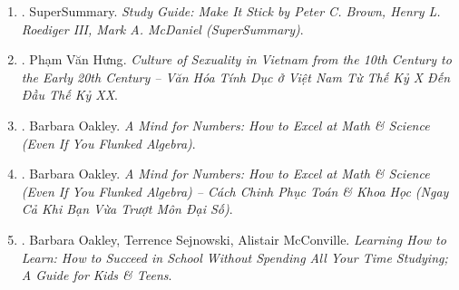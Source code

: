 \documentclass{article}
\begin{document}
\begin{enumerate}
\begin{itemize}
		\item ``Learning is essential \& life-long. Yet as these authors argue convincingly, people often use exactly the wrong strategies \& don't appreciate the ones that work. We've learned a lot in the last decade about applying cognitive science to real-world learning, \& this book combines everyday examples with clear explanations of the research. It's easy to read -- \& should be easy to learn from, too!'' -- {\sc Daniel L. Schacter}, author of {\it The 7 Sins of Memory}
		\item ``Anyone who teaches anything would benefit from reading this book: coaches, tutors, classroom teachers, parents, even corporate trainers. Instead of dong what we've always done \& wondering why some learners just don't get it, we can take a different approach that's based on research, even if it seems counterintuitive.'' -- {\sc Jennifer Gonzales}, {\it Cult of Pedagogy}
	\end{itemize}
	{\sf About the Author.} {\sc Peter C. Brown} is a writer \& former management consultant. {\sc Henry L. Roediger III} is James S. McDonnell Distinguished University Professor of Psychology at Washington University in St. Louis. {\sc Mark A. McDaniel} is Professor of Psychology \& Director of the Center for Integrative Research on Cognition, Learning, \& Education (CIRCLE) at Washington University in St. Louis.

	\item \cite{SuperSummary_Brown_Roediger_McDaniel_stick}. {\sc SuperSummary}. {\it Study Guide: Make It Stick by Peter C. Brown, Henry L. Roediger III, Mark A. McDaniel (SuperSummary)}.

	\item \cite{Hung_sex_culture}. {\sc Phạm Văn Hưng}. {\it Culture of Sexuality in Vietnam from the 10th Century to the Early 20th Century -- Văn Hóa Tính Dục ở Việt Nam Từ Thế Kỷ X Đến Đầu Thế Kỷ XX}.\hfill{\sf[done]}

	\item \cite{Oakley_mind_number}. Barbara Oakley. {\it A Mind for Numbers: How to Excel at Math \& Science (Even If You Flunked Algebra)}.\hfill{\sf[reading]}

	\item \cite{Oakley_mind_number}. Barbara Oakley. {\it A Mind for Numbers: How to Excel at Math \& Science (Even If You Flunked Algebra) -- Cách Chinh Phục Toán \& Khoa Học (Ngay Cả Khi Bạn Vừa Trượt Môn Đại Số)}.\hfill{\sf[done]}

	\item \cite{Oakley_Sejnowski_McConville_learn_how_learn}. Barbara Oakley, Terrence Sejnowski, Alistair McConville. {\it Learning How to Learn: How to Succeed in School Without Spending All Your Time Studying; A Guide for Kids \& Teens}.\hfill{\sf[reading]}


\end{enumerate}
\end{document}
